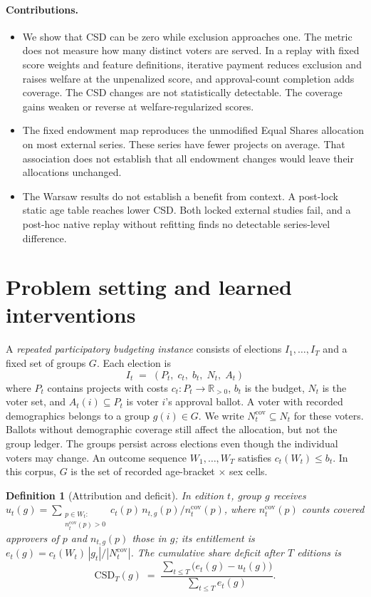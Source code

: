\documentclass{article}
\newtheorem{definition}{Definition}
\newcommand{\csd}{\mathrm{CSD}}
\begin{document}
\paragraph{Contributions.}
\begin{itemize}
\item We show that CSD can be zero while exclusion approaches one. The metric
does not measure how many distinct voters are served. In a replay with fixed
score weights and feature definitions, iterative payment reduces exclusion and
raises welfare at the unpenalized score, and approval-count completion adds
coverage. The CSD changes are not statistically detectable. The coverage gains
weaken or reverse at welfare-regularized scores.
\item The fixed endowment map reproduces the unmodified Equal Shares allocation
on most external series. These series have fewer projects on average. That
association does not establish that all endowment changes would leave their
allocations unchanged.
\item The Warsaw results do not establish a benefit from context. A post-lock
static age table reaches lower CSD. Both locked external studies fail, and a
post-hoc native replay without refitting finds no detectable series-level
difference.
\end{itemize}

\section{Problem setting and learned interventions}
\label{sec:setting}

A \emph{repeated participatory budgeting instance} consists of elections
$I_1, \dots, I_T$ and a fixed set of groups $G$. Each election is
\[
I_t \;=\; (P_t,\; c_t,\; b_t,\; N_t,\; A_t)
\]
where $P_t$ contains projects with costs
$c_t : P_t \to \mathbb{R}_{>0}$, $b_t$ is the budget, $N_t$ is the voter set,
and $A_t(i) \subseteq P_t$ is voter $i$'s approval ballot. A voter with recorded
demographics belongs to a group $g(i) \in G$. We write
$N_t^{\mathrm{cov}}\subseteq N_t$ for these voters. Ballots without demographic
coverage still affect the allocation, but not the group ledger. The groups
persist across elections even though the individual voters may change. An
outcome sequence $W_1, \dots, W_T$ satisfies $c_t(W_t) \le b_t$. In this corpus,
$G$ is the set of recorded age-bracket $\times$ sex cells.

\begin{definition}[Attribution and deficit]
\label{def:csd}
In edition $t$, group $g$ receives
$u_t(g) = \sum_{\substack{p \in W_t:\\ n_t^{\mathrm{cov}}(p)>0}}
c_t(p)\, n_{t,g}(p) /
n_t^{\mathrm{cov}}(p)$, where $n_t^{\mathrm{cov}}(p)$ counts covered
approvers of $p$ and $n_{t,g}(p)$ those in $g$; its entitlement is
$e_t(g) = c_t(W_t)\, |g_t| / |N_t^{\mathrm{cov}}|$. The
\emph{cumulative share deficit} after $T$ editions is
\[
\csd_T(g) \;=\; \frac{\sum_{t \le T}\bigl(e_t(g) - u_t(g)\bigr)}
                     {\sum_{t \le T} e_t(g)} .
\]
\end{definition}
\end{document}
